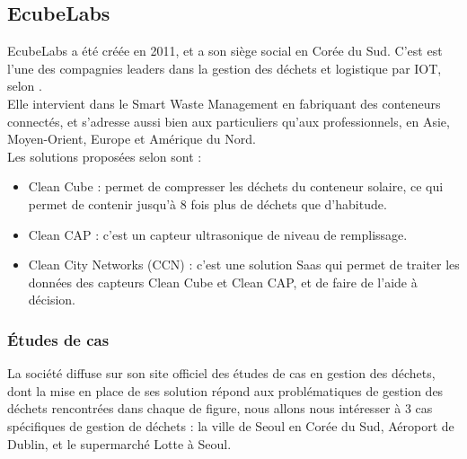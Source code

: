 \documentclass[a4paper,12pt]{report}
\begin{document}
\subsection{EcubeLabs}
EcubeLabs a été créée en 2011, et a son siège social en Corée du Sud. C'est est l'une des compagnies leaders dans la gestion des déchets et logistique par IOT, selon \cite{ref6}.\\
Elle intervient dans le Smart Waste Management en fabriquant des conteneurs connectés, et s'adresse aussi bien aux particuliers qu'aux professionnels, en Asie, Moyen-Orient, Europe et Amérique du Nord.\\


Les solutions proposées selon \cite{ref7} sont :
\begin{itemize}
\item Clean Cube : permet de compresser les déchets du conteneur solaire, ce qui permet de contenir jusqu'à 8 fois plus de déchets que d'habitude.
\item Clean CAP : c'est un capteur ultrasonique de niveau de remplissage.
\item Clean City Networks (CCN) : c'est une solution Saas qui permet de traiter les données des capteurs Clean Cube et Clean CAP, et de faire de l'aide à décision.
\end{itemize}

\subsubsection*{Études de cas}
La société diffuse sur son site officiel des études de cas en gestion des déchets, dont la mise en place de ses solution répond aux problématiques de gestion des déchets rencontrées dans chaque de figure, nous allons nous intéresser à 3 cas spécifiques de gestion de déchets : la ville de Seoul en Corée du Sud, Aéroport de Dublin, et le supermarché Lotte à Seoul. 
\end{document}
